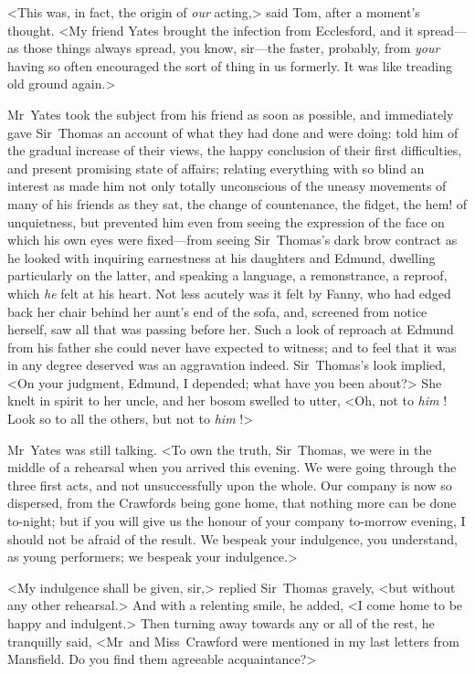 <This was, in fact, the origin of \textit{our}  acting,> said Tom, after a moment's thought. <My friend Yates brought the infection from Ecclesford, and it spread—as those things always spread, you know, sir—the faster, probably, from \textit{your}  having so often encouraged the sort of thing in us formerly. It was like treading old ground again.>

Mr~Yates took the subject from his friend as soon as possible, and immediately gave Sir~Thomas an account of what they had done and were doing: told him of the gradual increase of their views, the happy conclusion of their first difficulties, and present promising state of affairs; relating everything with so blind an interest as made him not only totally unconscious of the uneasy movements of many of his friends as they sat, the change of countenance, the fidget, the hem! of unquietness, but prevented him even from seeing the expression of the face on which his own eyes were fixed—from seeing Sir~Thomas's dark brow contract as he looked with inquiring earnestness at his daughters and Edmund, dwelling particularly on the latter, and speaking a language, a remonstrance, a reproof, which \textit{he}  felt at his heart. Not less acutely was it felt by Fanny, who had edged back her chair behind her aunt's end of the sofa, and, screened from notice herself, saw all that was passing before her. Such a look of reproach at Edmund from his father she could never have expected to witness; and to feel that it was in any degree deserved was an aggravation indeed. Sir~Thomas's look implied, <On your judgment, Edmund, I depended; what have you been about?> She knelt in spirit to her uncle, and her bosom swelled to utter, <Oh, not to \textit{him} ! Look so to all the others, but not to \textit{him} !>

Mr~Yates was still talking. <To own the truth, Sir~Thomas, we were in the middle of a rehearsal when you arrived this evening. We were going through the three first acts, and not unsuccessfully upon the whole. Our company is now so dispersed, from the Crawfords being gone home, that nothing more can be done to-night; but if you will give us the honour of your company to-morrow evening, I should not be afraid of the result. We bespeak your indulgence, you understand, as young performers; we bespeak your indulgence.>

<My indulgence shall be given, sir,> replied Sir~Thomas gravely, <but without any other rehearsal.> And with a relenting smile, he added, <I come home to be happy and indulgent.> Then turning away towards any or all of the rest, he tranquilly said, <Mr~and Miss~Crawford were mentioned in my last letters from Mansfield. Do you find them agreeable acquaintance?>

